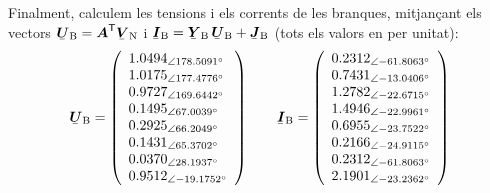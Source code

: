 \begin{exemple}
    Finalment, calculem les tensions i els corrents de les branques,
    mitjançant els vectors $\mcmplx{U}\ped{B} = \transp{\boldsymbol{A}}
    \mcmplx{V}\ped{N}$ i $\mcmplx{I}\ped{B} =  \mcmplx{Y}\ped{B}\,
    \mcmplx{U}\ped{B} + \mcmplx{J}\ped{B}$ (tots els valors en per unitat):
    \[
       \mcmplx{U}\ped{B} =
       \left(\begin{array}{l}
         \numpd{1,0494}{ 178,5091} \\
         \numpd{1,0175}{ 177,4776} \\
         \numpd{0,9727}{ 169,6442} \\
         \numpd{0,1495}{  67,0039} \\
         \numpd{0,2925}{  66,2049} \\
         \numpd{0,1431}{  65,3702} \\
         \numpd{0,0370}{  28,1937} \\
         \numpd{0,9512}{ -19,1752}
       \end{array}\right)
       \qquad
       \mcmplx{I}\ped{B} =
       \left(\begin{array}{l}
         \numpd{0,2312}{-61,8063} \\
         \numpd{0,7431}{-13,0406} \\
         \numpd{1,2782}{-22,6715} \\
         \numpd{1,4946}{-22,9961} \\
         \numpd{0,6955}{-23,7522} \\
         \numpd{0,2166}{-24,9115} \\
         \numpd{0,2312}{-61,8063} \\
         \numpd{2,1901}{-23,2362}
       \end{array}\right)
    \]


\end{exemple}
